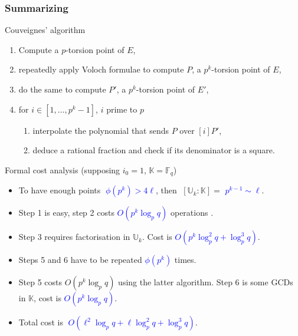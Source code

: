 \documentclass[10pt]{beamer}
\newcommand{\blue}[1]{\textcolor{blue}{#1}}  %
\newcommand{\K}{\mathbb{K}}  %
\newcommand{\U}{\mathbb{U}}  %
\newcommand{\F}{\mathbb{F}}  %
\newcommand{\euler}{\phi}  %
\newcommand{\0}{\mathcal{O}}  %
\begin{document}
\begin{frame}
  \frametitle{Summarizing}

  \vspace{-2mm}

  \begin{block}{Couveignes' algorithm}
    \begin{enumerate}
    \item Compute a $p$-torsion point of $E$,
    \item repeatedly apply Voloch formulae to compute $P$, a $p^k$-torsion
      point of $E$,
    \item do the same to compute $P'$, a $p^k$-torsion point
      of $E'$,
    \item for $i \in [1,\dots,p^k-1]$, $i$ prime to $p$
      \begin{enumerate}
      \item interpolate the polynomial that sends $P$ over $[i]P'$,
      \item deduce a rational fraction and check if its denominator is
        a square.
      \end{enumerate}
    \end{enumerate}
  \end{block}

  \vspace{-2mm}

  \begin{block}{Formal cost analysis (supposing $i_0 = 1$, $\K=\F_q$)}
    \begin{itemize}
    \item To have enough points \blue{$\;\euler(p^k) > 4\ell$}, then
      $\;[\U_k:\K] =$ \blue{$p^{k-1} \sim \ell$}.
    \item Step 1 is easy, step 2 costs \blue{$O(p^k\log_pq)$}
      operations .
    \item Step 3 requires factorisation in $\U_k$. Cost is
      \blue{$O(p^{k}\log_p^2q + \log_p^3q)$}.
    \item Steps 5 and 6 have to be repeated
      \blue{$\euler(p^k)$} times.
    \item Step 5 costs \alert{$O(p^k\log_pq)$} using the latter
      algorithm. Step 6 is some GCDs in $\K$, cost is
      \blue{$O(p^k\log_pq)$}.
    \item Total cost is \blue{$\;O(\ell^2\log_pq + \ell\log_p^2q + \log_p^3q)$}.
    \end{itemize}
  \end{block}
\end{frame}
\end{document}
